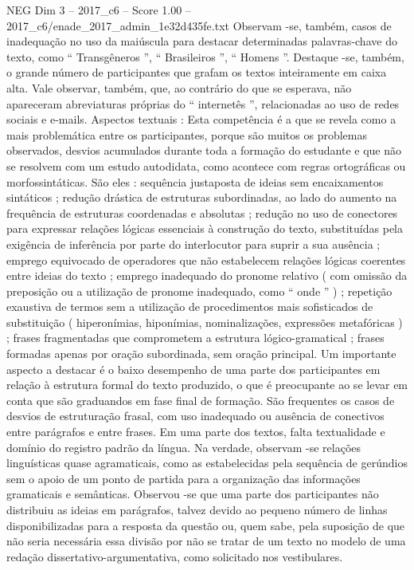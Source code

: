 \begin{textsample}{NEG Dim 3 – 2017\_c6 – Score 1.00 – 2017\_c6/enade\_2017\_admin\_1e32d435fe.txt}
Observam -se, também, casos de inadequação no uso da maiúscula para destacar determinadas palavras-chave do texto, como “ Transgêneros ”, “ Brasileiros ”, “ Homens ”.
Destaque -se, também, o grande número de participantes que grafam os textos inteiramente em caixa alta.
Vale observar, também, que, ao contrário do que se esperava, não apareceram abreviaturas próprias do “ internetês ”, relacionadas ao uso de redes sociais e e-mails.
Aspectos textuais : Esta competência é a que se revela como a mais problemática entre os participantes, porque são muitos os problemas observados, desvios acumulados durante toda a formação do estudante e que não se resolvem com um estudo autodidata, como acontece com regras ortográficas ou morfossintáticas.
São eles : sequência justaposta de ideias sem encaixamentos sintáticos ; redução drástica de estruturas subordinadas, ao lado do aumento na frequência de estruturas coordenadas e absolutas ; redução no uso de conectores para expressar relações lógicas essenciais à construção do texto, substituídas pela exigência de inferência por parte do interlocutor para suprir a sua ausência ; emprego equivocado de operadores que não estabelecem relações lógicas coerentes entre ideias do texto ; emprego inadequado do pronome relativo ( com omissão da preposição ou a utilização de pronome inadequado, como “ onde ” ) ; repetição exaustiva de termos sem a utilização de procedimentos mais sofisticados de substituição ( hiperonímias, hiponímias, nominalizações, expressões metafóricas ) ; frases fragmentadas que comprometem a estrutura lógico-gramatical ; frases formadas apenas por oração subordinada, sem oração principal.
Um importante aspecto a destacar é o baixo desempenho de uma parte dos participantes em relação à estrutura formal do texto produzido, o que é preocupante ao se levar em conta que são graduandos em fase final de formação.
São frequentes os casos de desvios de estruturação frasal, com uso inadequado ou ausência de conectivos entre parágrafos e entre frases.
Em uma parte dos textos, falta textualidade e domínio do registro padrão da língua.
Na verdade, observam -se relações linguísticas quase agramaticais, como as estabelecidas pela sequência de gerúndios sem o apoio de um ponto de partida para a organização das informações gramaticais e semânticas.
Observou -se que uma parte dos participantes não distribuiu as ideias em parágrafos, talvez devido ao pequeno número de linhas disponibilizadas para a resposta da questão ou, quem sabe, pela suposição de que não seria necessária essa divisão por não se tratar de um texto no modelo de uma redação dissertativo-argumentativa, como solicitado nos vestibulares.

\end{textsample}
